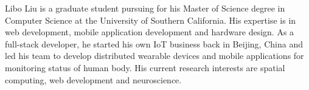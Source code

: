 \documentclass[conference]{IEEEtran}
\begin{document}
\begin{IEEEbiography}{Libo Liu}
 is a graduate student pursuing for his Master of Science degree in Computer Science at the University of Southern California. His expertise is in web development, mobile application development and hardware design. As a full-stack developer, he started his own IoT business back in Beijing, China and led his team to develop distributed wearable devices and mobile applications for monitoring status of human body. His current research interests are spatial computing, web development and neuroscience.
\end{IEEEbiography}
\end{document}
